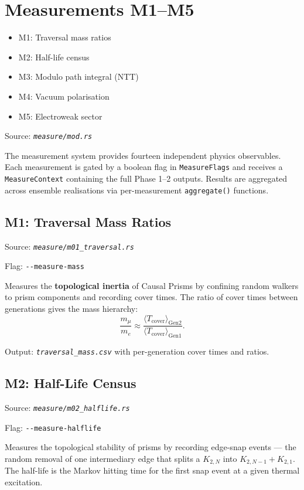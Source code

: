 \documentclass[11pt, a4paper, openany]{book}
\newcommand{\code}[1]{\texttt{#1}}
\newcommand{\func}[1]{\texttt{\color{structure}#1}}
\newcommand{\flag}[1]{\texttt{-{}-#1}}
\newcommand{\file}[1]{\texttt{\itshape #1}}
\newenvironment{introduction}[1][Chapter Overview]{%
  \begin{tcolorbox}[
    enhanced,colback=structure!5,colframe=structure,
    colbacktitle=structure,coltitle=white,
    fonttitle=\small\bfseries,title={#1},
    arc=2pt,boxrule=0.7pt,
    left=8pt,right=8pt,top=6pt,bottom=6pt,
    before skip=12pt,after skip=12pt
  ]\itshape\begin{itemize}[leftmargin=*,itemsep=2pt,parsep=0pt]
}{%
  \end{itemize}\end{tcolorbox}
}
\begin{document}
\chapter{Measurements M1--M5}

\begin{introduction}
  \item M1: Traversal mass ratios
  \item M2: Half-life census
  \item M3: Modulo path integral (NTT)
  \item M4: Vacuum polarisation
  \item M5: Electroweak sector
\end{introduction}

Source: \file{measure/mod.rs}

The measurement system provides fourteen independent physics observables.  Each
measurement is gated by a boolean flag in \code{MeasureFlags} and receives a
\code{MeasureContext} containing the full Phase 1--2 outputs.  Results are
aggregated across ensemble realisations via per-measurement \func{aggregate()}
functions.

\section{M1: Traversal Mass Ratios}

Source: \file{measure/m01\_traversal.rs}

Flag: \flag{measure-mass}

Measures the \textbf{topological inertia} of Causal Prisms by confining random
walkers to prism components and recording cover times.  The ratio of cover times
between generations gives the mass hierarchy:
\[
  \frac{m_\mu}{m_e} \approx \frac{\langle T_{\text{cover}} \rangle_{\text{Gen2}}}
  {\langle T_{\text{cover}} \rangle_{\text{Gen1}}}.
\]

Output: \file{traversal\_mass.csv} with per-generation cover times and ratios.

\section{M2: Half-Life Census}

Source: \file{measure/m02\_halflife.rs}

Flag: \flag{measure-halflife}

Measures the topological stability of prisms by recording edge-snap events
--- the random removal of one intermediary edge that splits a $K_{2,N}$ into
$K_{2,N-1} + K_{2,1}$.  The half-life is the Markov hitting time for the first
snap event at a given thermal excitation.
\end{document}
